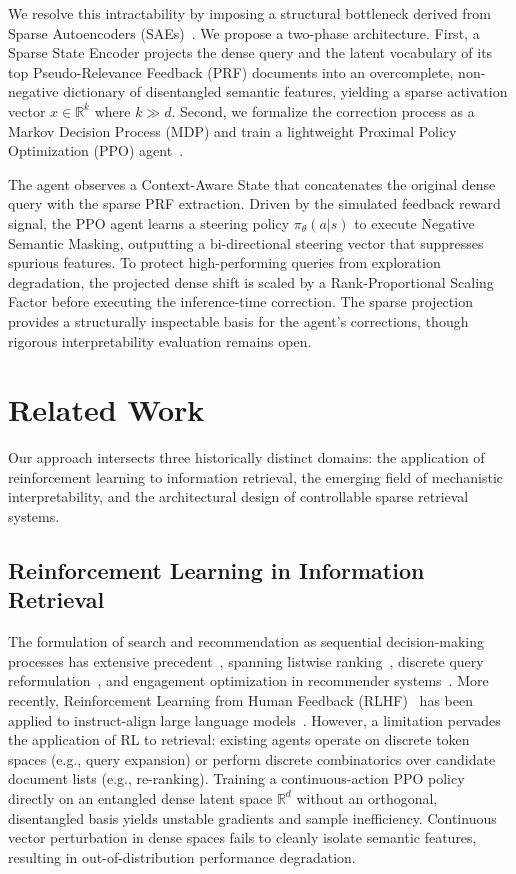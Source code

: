 \documentclass[sigconf]{acmart}
\begin{document}
We resolve this intractability by imposing a structural bottleneck derived from Sparse Autoencoders (SAEs)~\cite{cunningham2024, elhage2022, bricken2023}. We propose a two-phase architecture. First, a Sparse State Encoder projects the dense query and the latent vocabulary of its top Pseudo-Relevance Feedback (PRF) documents into an overcomplete, non-negative dictionary of disentangled semantic features, yielding a sparse activation vector $x \in \mathbb{R}^k$ where $k \gg d$. Second, we formalize the correction process as a Markov Decision Process (MDP) and train a lightweight Proximal Policy Optimization (PPO) agent~\cite{schulman2017}.

The agent observes a Context-Aware State that concatenates the original dense query with the sparse PRF extraction. Driven by the simulated feedback reward signal, the PPO agent learns a steering policy $\pi_\theta(a|s)$ to execute Negative Semantic Masking, outputting a bi-directional steering vector that suppresses spurious features. To protect high-performing queries from exploration degradation, the projected dense shift is scaled by a Rank-Proportional Scaling Factor before executing the inference-time correction. The sparse projection provides a structurally inspectable basis for the agent's corrections, though rigorous interpretability evaluation remains open.

\section{Related Work}

Our approach intersects three historically distinct domains: the application of reinforcement learning to information retrieval, the emerging field of mechanistic interpretability, and the architectural design of controllable sparse retrieval systems.

\subsection{Reinforcement Learning in Information Retrieval}

The formulation of search and recommendation as sequential decision-making processes has extensive precedent~\cite{afsar2022}, spanning listwise ranking~\cite{hofmann2013, wei2017, hu2018}, discrete query reformulation~\cite{nogueira2017, buck2018}, and engagement optimization in recommender systems~\cite{ouyang2021, zou2019, zheng2018, zhao2018, chen2019, yao2018}. More recently, Reinforcement Learning from Human Feedback (RLHF)~\cite{christiano2017} has been applied to instruct-align large language models~\cite{ouyang2022, stiennon2020, bai2022, ziegler2019}. However, a limitation pervades the application of RL to retrieval: existing agents operate on discrete token spaces (e.g., query expansion) or perform discrete combinatorics over candidate document lists (e.g., re-ranking). Training a continuous-action PPO policy directly on an entangled dense latent space $\mathbb{R}^d$ without an orthogonal, disentangled basis yields unstable gradients and sample inefficiency. Continuous vector perturbation in dense spaces fails to cleanly isolate semantic features, resulting in out-of-distribution performance degradation.
\end{document}
